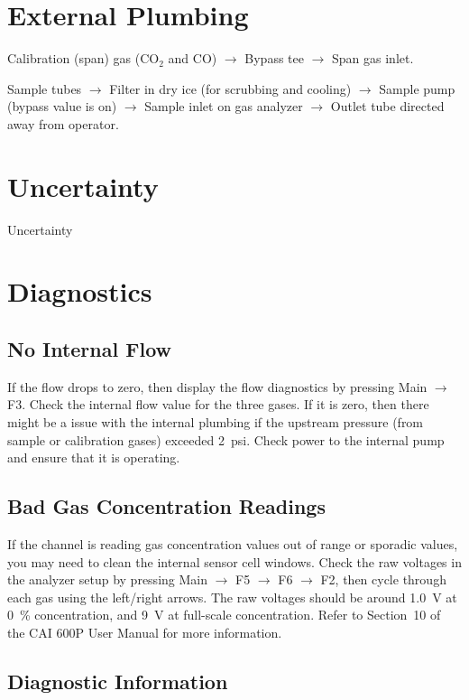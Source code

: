 \documentclass[11pt,oneside]{book}
\begin{document}
\section{External Plumbing}

Calibration (span) gas (CO$_2$ and CO) $\rightarrow$ Bypass tee $\rightarrow$ Span gas inlet.

Sample tubes $\rightarrow$ Filter in dry ice (for scrubbing and cooling) $\rightarrow$ Sample pump (bypass value is on) $\rightarrow$ Sample inlet on gas analyzer $\rightarrow$ Outlet tube directed away from operator.

\section{Uncertainty}

Uncertainty

\section{Diagnostics}

\subsection{No Internal Flow}

If the flow drops to zero, then display the flow diagnostics by pressing Main $\rightarrow$ F3. Check the internal flow value for the three gases. If it is zero, then there might be a issue with the internal plumbing if the upstream pressure (from sample or calibration gases) exceeded 2~psi. Check power to the internal pump and ensure that it is operating.

\subsection{Bad Gas Concentration Readings}

If the channel is reading gas concentration values out of range or sporadic values, you may need to clean the internal sensor cell windows. Check the raw voltages in the analyzer setup by pressing Main $\rightarrow$ F5 $\rightarrow$ F6 $\rightarrow$ F2, then cycle through each gas using the left/right arrows. The raw voltages should be around 1.0~V at 0~\% concentration, and 9~V at full-scale concentration. Refer to Section~10 of the CAI 600P User Manual for more information.

\subsection{Diagnostic Information}
\end{document}
